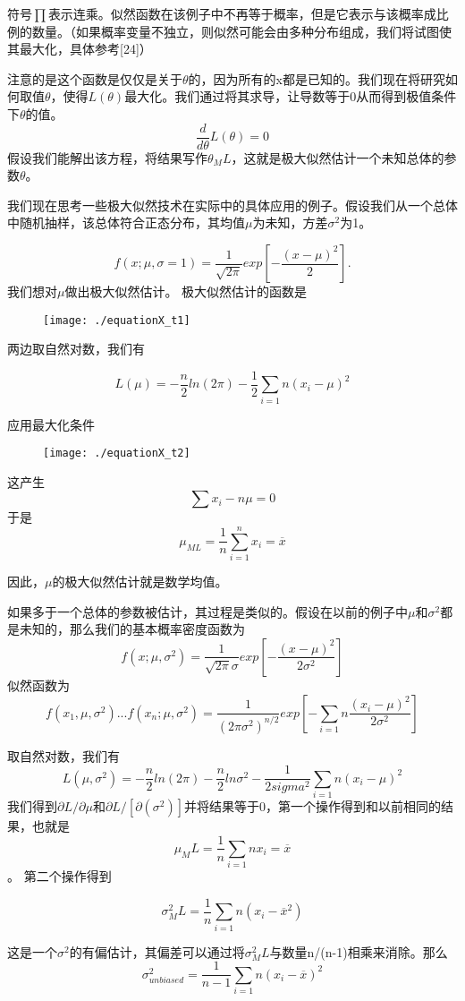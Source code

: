 \documentclass[cn,11pt,chinese]{elegantbook}
\begin{document}
{符号$\prod$表示连乘。似然函数在该例子中不再等于概率，但是它表示与该概率成比例的数量。（如果概率变量不独立，则似然可能会由多种分布组成，我们将试图使其最大化，具体参考[24]）

注意的是这个函数是仅仅是关于$\theta$的，因为所有的x都是已知的。我们现在将研究如何取值$\theta$，使得$L(\theta)$最大化。我们通过将其求导，让导数等于0从而得到极值条件下$\theta$的值。
$$\frac{d}{d\theta}L(\theta) =0$$
假设我们能解出该方程，将结果写作$\theta_ML$，这就是极大似然估计一个未知总体的参数$\theta$。

我们现在思考一些极大似然技术在实际中的具体应用的例子。假设我们从一个总体中随机抽样，该总体符合正态分布，其均值$\mu$为未知，方差$\sigma^2$为1。

$$f(x;\mu,\sigma=1)=\frac{1}{\sqrt{2\pi}}exp[-\frac{(x-\mu)^2}{2}].$$
我们想对$\mu$做出极大似然估计。
极大似然估计的函数是

\begin{figure}
	\texttt{[image: ./equationX\_t1]}
\end{figure}

两边取自然对数，我们有

$$L(\mu)=-\frac{n}{2}ln(2\pi)-\frac{1}{2}\sum_{i=1}{n}(x_i-\mu)^2$$

应用最大化条件

\begin{figure}
	\texttt{[image: ./equationX\_t2]}
\end{figure}


这产生
$$\sum x_i - n\mu   =0$$
于是
$$\mu_{ML}=\frac{1}{n}\sum_{i=1}^n x_i=\overline{x}$$

因此，$\mu$的极大似然估计就是数学均值。

如果多于一个总体的参数被估计，其过程是类似的。假设在以前的例子中$\mu$和$\sigma^2$都是未知的，那么我们的基本概率密度函数为
$$f(x;\mu,\sigma^2)=\frac{1}{\sqrt{2\pi}\sigma}exp[-\frac{(x-\mu)^2}{2\sigma^2}]$$
似然函数为
$$f(x_1,\mu,\sigma^2)...f(x_n;\mu,\sigma^2)=\frac{1}{(2\pi\sigma^2)^{n/2}}exp[-\sum_{i=1}{n}\frac{(x_i-\mu)^2}{2\sigma^2}]$$

取自然对数，我们有
$$L(\mu,\sigma^2)=-\frac{n}{2}ln(2\pi)-\frac{n}{2}ln\sigma^2-\frac{1}{2sigma^2}\sum_{i=1}{n}(x_i-\mu)^2$$
我们得到$\partial L/\partial \mu$和$\partial L/ [\partial(\sigma^2)]$并将结果等于0，第一个操作得到和以前相同的结果，也就是
$$\mu_ML=\frac{1}{n}\sum_{i=1}{n}x_i=\overline{x}$$。
第二个操作得到

$$\sigma^2_ML=\frac{1}{n}\sum_{i=1}{n}(x_i-\overline{x}^2)$$

这是一个$\sigma^2$的有偏估计，其偏差可以通过将$\sigma^2_ML$与数量n/(n-1)相乘来消除。那么
$$\sigma^2_{unbiased}=\frac{1}{n-1}\sum_{i=1}{n}(x_i-\overline{x})^2$$

}
\end{document}
